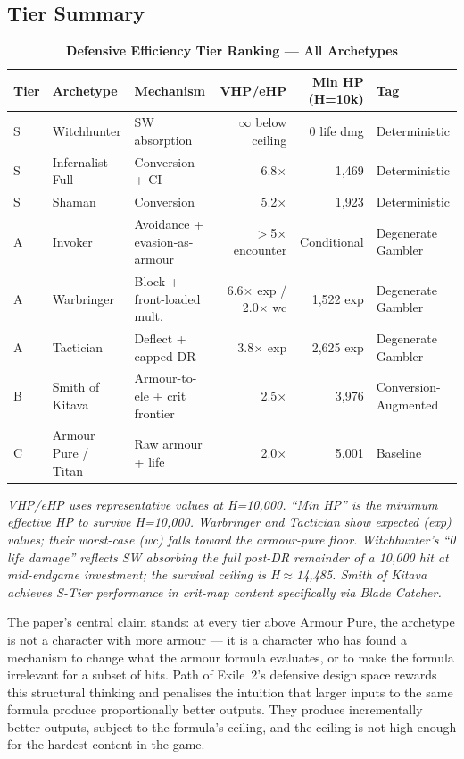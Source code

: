 \documentclass[12pt, letterpaper]{article}
\newcommand{\namedsubsection}[1]{%
    \subsection*{#1}%
    \addcontentsline{toc}{subsection}{#1}%
}
\begin{document}
\namedsubsection{Tier Summary}

\begin{table}[htbp]
\centering
\caption{\textbf{Defensive Efficiency Tier Ranking --- All Archetypes}}
{\small
\begin{tabular}{lllrrl}
\toprule
\textbf{Tier} & \textbf{Archetype} & \textbf{Mechanism} & \textbf{VHP/eHP} & \textbf{Min HP (H=10k)} & \textbf{Tag} \\
\midrule
\rowcolor{tierS} S & Witchhunter & SW absorption & $\infty$ below ceiling & 0 life dmg & Deterministic \\
\rowcolor{tierS} S & Infernalist Full & Conversion + CI & 6.8$\times$ & 1{,}469 & Deterministic \\
\rowcolor{tierS} S & Shaman & Conversion & 5.2$\times$ & 1{,}923 & Deterministic \\
\rowcolor{tierA} A & Invoker & Avoidance + evasion-as-armour & $>$5$\times$ encounter & Conditional & Degenerate Gambler \\
\rowcolor{tierA} A & Warbringer & Block + front-loaded mult. & 6.6$\times$ exp / 2.0$\times$ wc & 1{,}522 exp & Degenerate Gambler \\
\rowcolor{tierA} A & Tactician & Deflect + capped DR & 3.8$\times$ exp & 2{,}625 exp & Degenerate Gambler \\
\rowcolor{tierB} B & Smith of Kitava & Armour-to-ele + crit frontier & 2.5$\times$ & 3{,}976 & Conversion-Augmented \\
\rowcolor{tierD} C & Armour Pure / Titan & Raw armour + life & 2.0$\times$ & 5{,}001 & Baseline \\
\bottomrule
\end{tabular}
}
\smallskip
\begin{minipage}{\linewidth}
\small\textit{VHP/eHP uses representative values at H=10{,}000. ``Min HP'' is the minimum effective HP to survive H=10{,}000. Warbringer and Tactician show expected (exp) values; their worst-case (wc) falls toward the armour-pure floor. Witchhunter's ``0 life damage'' reflects SW absorbing the full post-DR remainder of a 10{,}000 hit at mid-endgame investment; the survival ceiling is H$\approx$14{,}485. Smith of Kitava achieves S-Tier performance in crit-map content specifically via Blade Catcher.}
\end{minipage}
\end{table}

The paper's central claim stands: at every tier above Armour Pure, the archetype is not a character with more armour --- it is a character who has found a mechanism to change what the armour formula evaluates, or to make the formula irrelevant for a subset of hits. Path of Exile~2's defensive design space rewards this structural thinking and penalises the intuition that larger inputs to the same formula produce proportionally better outputs. They produce incrementally better outputs, subject to the formula's ceiling, and the ceiling is not high enough for the hardest content in the game.
\end{document}

